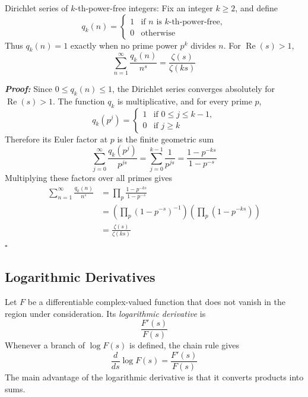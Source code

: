 \documentclass[a4paper,11pt,abstracton]{scrartcl}
\theoremstyle{dotlessP}
\theoremstyle{dotlessS}
\theoremstyle{remark}
\theoremstyle{definition}
\begin{document}
\begin{mainbox}{Dirichlet series of $k$-th-power-free integers:}
Fix an integer $k\geq2$, and define
\[
    q_k(n)=
      \begin{cases}
          1 & \text{if $n$ is $k$-th-power-free},\\
          0 & \text{otherwise}
      \end{cases}
\]
Thus $q_k(n)=1$ exactly when no prime power $p^k$ divides $n$.
For $\operatorname{Re}(s)>1$,
\[
    \sum_{n=1}^{\infty}\frac{q_k(n)}{n^s}
      =\frac{\zeta(s)}{\zeta(ks)}
\]
\end{mainbox}

\begin{claim_box}
\textbf{\textit{Proof:}}
Since $0\leq q_k(n)\leq1$, the Dirichlet series converges absolutely
for $\operatorname{Re}(s)>1$. The function $q_k$ is multiplicative,
and for every prime $p$,
\[
    q_k(p^j)=
      \begin{cases}
          1 & \text{if $0\leq j\leq k-1$},\\
          0 & \text{if $j\geq k$}
      \end{cases}
\]
Therefore its Euler factor at $p$ is the finite geometric sum
\[
    \sum_{j=0}^{\infty}\frac{q_k(p^j)}{p^{js}}
      =\sum_{j=0}^{k-1}\frac1{p^{js}}
      =\frac{1-p^{-ks}}{1-p^{-s}}
\]
Multiplying these factors over all primes gives
\begin{align*}
    \sum_{n=1}^{\infty}\frac{q_k(n)}{n^s}
      &=\prod_p\frac{1-p^{-ks}}{1-p^{-s}}\\
      &=\left(\prod_p(1-p^{-s})^{-1}\right)
        \left(\prod_p(1-p^{-ks})\right)\\
      &=\frac{\zeta(s)}{\zeta(ks)}
\end{align*}
\hfill$\square$
\end{claim_box}

\subsection{Logarithmic Derivatives}
\label{subsec:logarithmic-derivatives}

Let $F$ be a differentiable complex-valued function that does not
vanish in the region under consideration. Its \emph{logarithmic
derivative} is
\[
    \frac{F'(s)}{F(s)}
\]
Whenever a branch of $\log F(s)$ is defined, the chain rule gives
\[
    \frac{d}{ds}\log F(s)=\frac{F'(s)}{F(s)}
\]
The main advantage of the logarithmic derivative is that it converts
products into sums.
\end{document}

